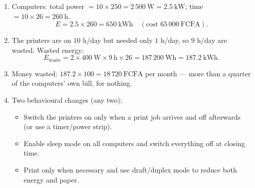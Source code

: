 \documentclass[11pt]{article}
\begin{document}
\begin{corrige}
\begin{enumerate}
\item Computers: total power $= 10 \times 250 = 2\,500\ \mathrm{W} = 2.5\ \mathrm{kW}$; time $= 10 \times 26 = 260\ \mathrm{h}$.
\[ E = 2.5 \times 260 = 650\ \mathrm{kWh} \quad (\text{cost } 65\,000\ \mathrm{FCFA}). \]
\item The printers are on $10$ h/day but needed only $1$ h/day, so $9$ h/day are wasted. Wasted energy:
\[ E_{\text{waste}} = 2 \times 400\ \mathrm{W} \times 9\ \mathrm{h} \times 26 = 187\,200\ \mathrm{Wh} = 187.2\ \mathrm{kWh}. \]
\item Money wasted: $187.2 \times 100 = 18\,720\ \mathrm{FCFA}$ per month --- more than a quarter of the computers' own bill, for nothing.
\item Two behavioural changes (any two):
\begin{itemize}
\item Switch the printers on only when a print job arrives and off afterwards (or use a timer/power strip).
\item Enable sleep mode on all computers and switch everything off at closing time.
\item Print only when necessary and use draft/duplex mode to reduce both energy and paper.
\end{itemize}
\end{enumerate}
\end{corrige}
\end{document}
